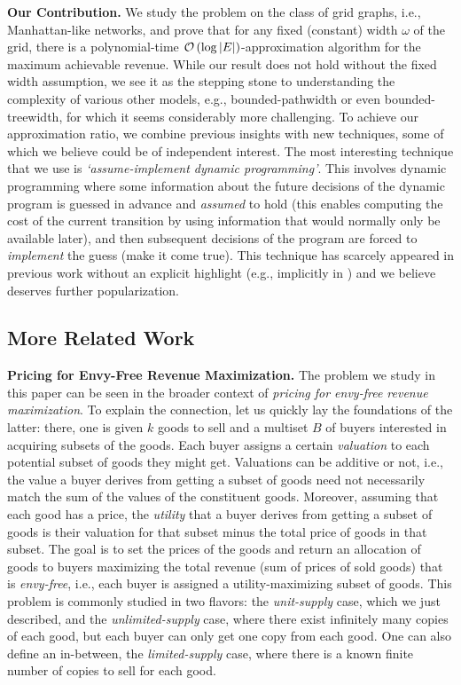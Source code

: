 \textbf{Our Contribution.} We study the problem on the class of grid graphs, i.e., Manhattan-like networks, and prove that for any fixed (constant) width $\omega$ of the grid, there is a polynomial-time $\mathcal{O} \left( \log |E| \right)$-ap\-prox\-i\-ma\-tion algorithm for the maximum achievable revenue. While our result does not hold without the fixed width assumption, we see it as the stepping stone to understanding the complexity of various other models, e.g., bounded-pathwidth or even bounded-treewidth, for which it seems considerably more challenging. To achieve our approximation ratio, we combine previous insights with new techniques, some of which we believe could be of independent interest. The most interesting technique that we use is \emph{`assume-implement dynamic programming'}. This involves dynamic programming where some information about the future decisions of the dynamic program is guessed in advance and \emph{assumed} to hold (this enables computing the cost of the current transition by using information that would normally only be available later), and then subsequent decisions of the program are forced to \emph{implement} the guess (make it come true). This technique has scarcely appeared in previous work without an explicit highlight (e.g., implicitly in \cite{assume_implement}) and we believe deserves further popularization.

\subsection{More Related Work}

\textbf{Pricing for Envy-Free Revenue Maximization.}
The problem we study in this paper can be seen in the broader context of \emph{pricing for envy-free revenue maximization}. To explain the connection, let us quickly lay the foundations of the latter: there, one is given $k$ goods to sell and a multiset $B$ of buyers interested in acquiring subsets of the goods. Each buyer assigns a certain \emph{valuation} to each potential subset of goods they might get. Valuations can be additive or not, i.e., the value a buyer derives from getting a subset of goods need not necessarily match the sum of the values of the constituent goods. Moreover, assuming that each good has a price, the \emph{utility} that a buyer derives from getting a subset of goods is their valuation for that subset minus the total price of goods in that subset. The goal is to set the prices of the goods and return an allocation of goods to buyers maximizing the total revenue (sum of prices of sold goods) that is \emph{envy-free}, i.e., each buyer is assigned a utility-maximizing subset of goods. This problem is commonly studied in two flavors: the \emph{unit-supply} case, which we just described, and the \emph{unlimited-supply} case, where there exist infinitely many copies of each good, but each buyer can only get one copy from each good. One can also define an in-between, the \emph{limited-supply} case, where there is a known finite number of copies to sell for each good.

